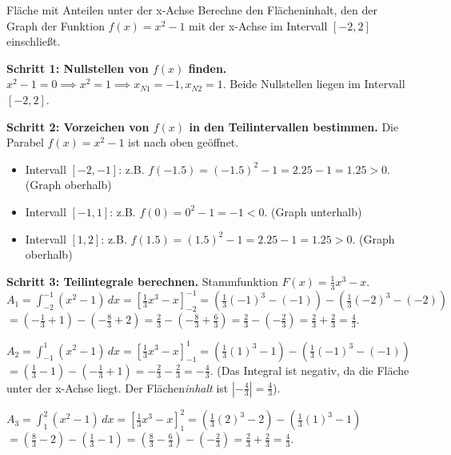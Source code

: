 \begin{beispielumgebung}{Fläche mit Anteilen unter der x-Achse}
Berechne den Flächeninhalt, den der Graph der Funktion $f(x) = x^2 - 1$ mit der x-Achse im Intervall $[-2, 2]$ einschließt.

\textbf{Schritt 1: Nullstellen von $f(x)$ finden.}
$x^2 - 1 = 0 \implies x^2 = 1 \implies x_{N1} = -1, x_{N2} = 1$.
Beide Nullstellen liegen im Intervall $[-2,2]$.

\textbf{Schritt 2: Vorzeichen von $f(x)$ in den Teilintervallen bestimmen.}
Die Parabel $f(x)=x^2-1$ ist nach oben geöffnet.
\begin{itemize}
    \item Intervall $[-2, -1]$: z.B. $f(-1.5) = (-1.5)^2-1 = 2.25-1 = 1.25 > 0$. (Graph oberhalb)
    \item Intervall $[-1, 1]$: z.B. $f(0) = 0^2-1 = -1 < 0$. (Graph unterhalb)
    \item Intervall $[1, 2]$: z.B. $f(1.5) = (1.5)^2-1 = 2.25-1 = 1.25 > 0$. (Graph oberhalb)
\end{itemize}

\textbf{Schritt 3: Teilintegrale berechnen.}
Stammfunktion $F(x) = \frac{1}{3}x^3 - x$.
$A_1 = \int_{-2}^{-1} (x^2-1) \,dx = [\frac{1}{3}x^3-x]_{-2}^{-1} = (\frac{1}{3}(-1)^3 - (-1)) - (\frac{1}{3}(-2)^3 - (-2))$
$= (-\frac{1}{3}+1) - (-\frac{8}{3}+2) = \frac{2}{3} - (-\frac{8}{3}+\frac{6}{3}) = \frac{2}{3} - (-\frac{2}{3}) = \frac{2}{3} + \frac{2}{3} = \frac{4}{3}$.

$A_2 = \int_{-1}^{1} (x^2-1) \,dx = [\frac{1}{3}x^3-x]_{-1}^{1} = (\frac{1}{3}(1)^3 - 1) - (\frac{1}{3}(-1)^3 - (-1))$
$= (\frac{1}{3}-1) - (-\frac{1}{3}+1) = -\frac{2}{3} - \frac{2}{3} = -\frac{4}{3}$.
(Das Integral ist negativ, da die Fläche unter der x-Achse liegt. Der Flächen\textit{inhalt} ist $|-\frac{4}{3}| = \frac{4}{3}$).

$A_3 = \int_{1}^{2} (x^2-1) \,dx = [\frac{1}{3}x^3-x]_{1}^{2} = (\frac{1}{3}(2)^3 - 2) - (\frac{1}{3}(1)^3 - 1)$
$= (\frac{8}{3}-2) - (\frac{1}{3}-1) = (\frac{8}{3}-\frac{6}{3}) - (-\frac{2}{3}) = \frac{2}{3} + \frac{2}{3} = \frac{4}{3}$.


\end{beispielumgebung}
